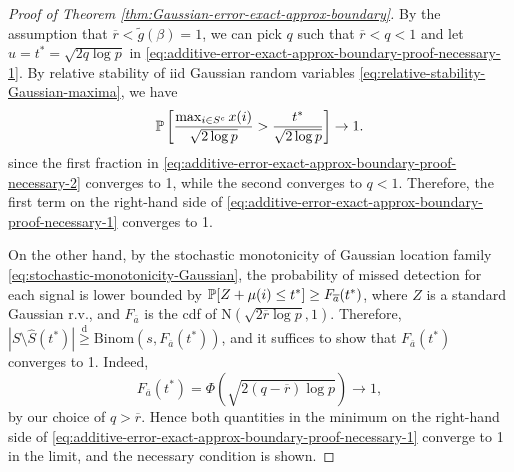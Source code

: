 \begin{proof}[Proof of Theorem \ref{thm:Gaussian-error-exact-approx-boundary}]
By the assumption that $\overline{r}<\widetilde{g}(\beta)=1$, we can pick $q$ such that $\overline{r}<q<1$ and let $u = t^*=\sqrt{2q\log{p}}$ in \eqref{eq:additive-error-exact-approx-boundary-proof-necessary-1}.
By relative stability of iid Gaussian random variables \eqref{eq:relative-stability-Gaussian-maxima}, we have
\begin{equation} \label{eq:additive-error-exact-approx-boundary-proof-necessary-2}
    \P\left[\frac{\max_{i\in S^c} x(i)}{\sqrt{2\log{p}}} > \frac{t^*}{\sqrt{2\log{p}}}\right] \to 1.
\end{equation}
since the first fraction in \eqref{eq:additive-error-exact-approx-boundary-proof-necessary-2} converges to 1, while the second converges to $q<1$.
Therefore, the first term on the right-hand side of \eqref{eq:additive-error-exact-approx-boundary-proof-necessary-1} converges to 1.

On the other hand, by the stochastic monotonicity of Gaussian location family \eqref{eq:stochastic-monotonicity-Gaussian}, the probability of missed detection for each signal is lower bounded by $\P[Z+\mu(i) \le t^*] \ge F_{\overline{a}}(t^*)$, where $Z$ is a standard Gaussian r.v., and $F_{\overline{a}}$ is the cdf of $\mathrm{N}(\sqrt{2\overline{r}\log{p}}, 1)$.
Therefore, $|{S}\setminus\widehat{S}(t^*)| \stackrel{\mathrm{d}}{\ge} \text{Binom}(s, {F_{\overline{a}}}(t^*))$, and it suffices to show that ${F_{\overline{a}}}(t^*)$ converges to 1.
Indeed,
\begin{equation*}
    {F_{\overline{a}}}(t^*) = \Phi(\sqrt{2(q-\overline{r})\log{p}}) \to 1,
\end{equation*}
by our choice of $q>\overline{r}$.
Hence both quantities in the minimum on the right-hand side of \eqref{eq:additive-error-exact-approx-boundary-proof-necessary-1} converge to 1 in the limit, and the necessary condition is shown.
\end{proof}






